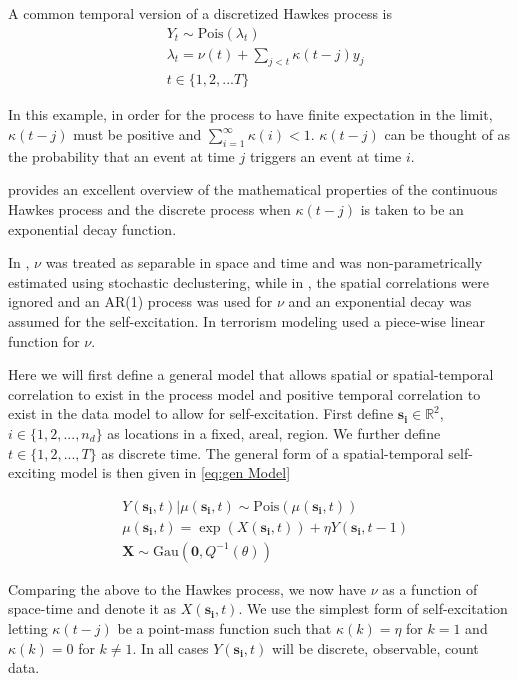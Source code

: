\documentclass[11pt]{isuthesis}
\begin{document}
A common temporal version of a discretized Hawkes process is
\begin{align}
& Y_t\sim \mbox{Pois}(\lambda_t) \\
& \lambda_t = \nu(t) + \sum_{j < t} \kappa (t-j) y_j \nonumber\\
& t \in \{1,2,...T\}
\end{align}

In this example, in order for the process to have finite expectation in the limit, $\kappa(t-j)$ must be positive and $\sum_{i=1}^{\infty} \kappa (i) <1$.  $\kappa (t-j)$ can be thought of as the probability that an event at time $j$ triggers an event at time $i$.

\cite{laub2015hawkes} provides an excellent overview of the mathematical properties of the continuous Hawkes process and the discrete process when $\kappa (t-j)$ is taken to be an exponential decay function.

In \cite{mohler2011self}, $\nu$ was treated as separable in space and time and was non-parametrically estimated using stochastic declustering, while in \cite{mohler2013modeling}, the spatial correlations were ignored and an AR(1) process was used for $\nu$ and an exponential decay was assumed for the self-excitation.  In terrorism modeling \cite{lewis2012self} used a piece-wise linear function for $\nu$.  

Here we will first define a general model that allows spatial or spatial-temporal correlation to exist in the process model and positive temporal correlation to exist in the data model to allow for self-excitation.  First define $\boldsymbol{s_i} \in \mathbb{R}^2$, $i \in \{1,2,...,n_d\}$ as locations in a fixed, areal, region. We further define $t \in \{1,2,...,T\}$ as discrete time. The general form of a spatial-temporal self-exciting model is then given in \eqref{eq:gen Model}

\begin{align}
& Y(\boldsymbol{s_i},t)|\mu(\boldsymbol{s_i},t) \sim \mbox{Pois}(\mu(\boldsymbol{s_i},t)) \label{eq:gen Model}\\
& \mu(\boldsymbol{s_i},t) = \exp(X(\boldsymbol{s_i},t)) + \eta Y(\boldsymbol{s_i},t-1) \nonumber \\
& \boldsymbol{X} \sim \mbox{Gau}(\boldsymbol{0},Q^{-1}(\theta)) \nonumber
\end{align}

Comparing the above to the Hawkes process, we now have $\nu$ as a function of space-time and denote it as $X(\boldsymbol{s_i},t)$.  We use the simplest form of self-excitation letting $\kappa(t-j)$ be a point-mass function such that $\kappa(k)=\eta$ for $k=1$ and $\kappa(k)=0$ for $k \neq 1$.  In all cases $Y(\boldsymbol{s_i},t)$ will be discrete, observable, count data.  
\end{document}
